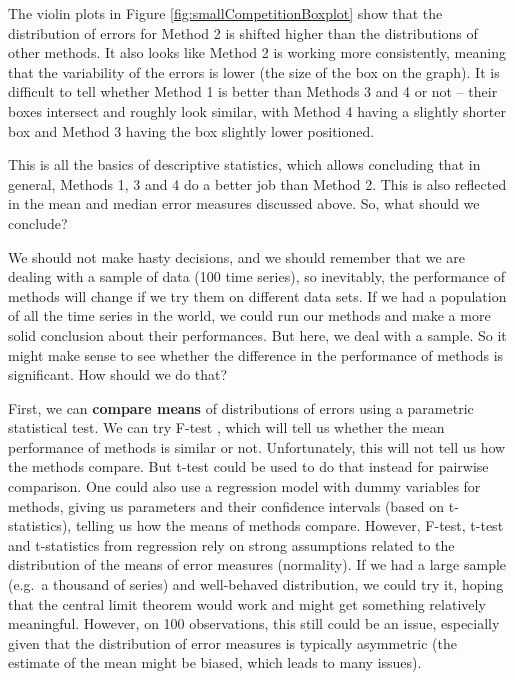 \documentclass[
]{book}
\theoremstyle{definition}
\theoremstyle{definition}
\theoremstyle{definition}
\theoremstyle{definition}
\theoremstyle{remark}
\begin{document}
The violin plots in Figure \ref{fig:smallCompetitionBoxplot} show that the distribution of errors for Method 2 is shifted higher than the distributions of other methods. It also looks like Method 2 is working more consistently, meaning that the variability of the errors is lower (the size of the box on the graph). It is difficult to tell whether Method 1 is better than Methods 3 and 4 or not -- their boxes intersect and roughly look similar, with Method 4 having a slightly shorter box and Method 3 having the box slightly lower positioned.

This is all the basics of descriptive statistics, which allows concluding that in general, Methods 1, 3 and 4 do a better job than Method 2. This is also reflected in the mean and median error measures discussed above. So, what should we conclude?

We should not make hasty decisions, and we should remember that we are dealing with a sample of data (100 time series), so inevitably, the performance of methods will change if we try them on different data sets. If we had a population of all the time series in the world, we could run our methods and make a more solid conclusion about their performances. But here, we deal with a sample. So it might make sense to see whether the difference in the performance of methods is significant. How should we do that?

First, we can \textbf{compare means} of distributions of errors using a parametric statistical test. We can try F-test \citep{WikipediaFTest}, which will tell us whether the mean performance of methods is similar or not. Unfortunately, this will not tell us how the methods compare. But t-test \citep{WikipediaTTest} could be used to do that instead for pairwise comparison. One could also use a regression model with dummy variables for methods, giving us parameters and their confidence intervals (based on t-statistics), telling us how the means of methods compare. However, F-test, t-test and t-statistics from regression rely on strong assumptions related to the distribution of the means of error measures (normality). If we had a large sample (e.g.~a thousand of series) and well-behaved distribution, we could try it, hoping that the central limit theorem would work and might get something relatively meaningful. However, on 100 observations, this still could be an issue, especially given that the distribution of error measures is typically asymmetric (the estimate of the mean might be biased, which leads to many issues).
\end{document}
